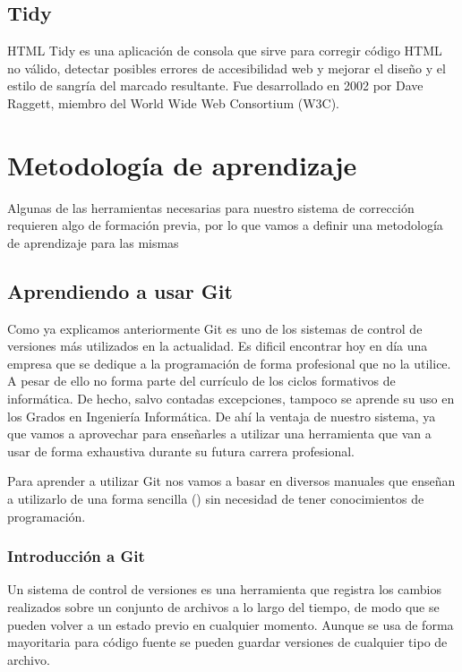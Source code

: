 \subsection {Tidy}

HTML Tidy es una aplicación de consola que sirve para corregir código HTML no válido, detectar posibles errores de accesibilidad web y mejorar el diseño y el estilo de sangría del marcado resultante. Fue desarrollado en 2002 por Dave Raggett, miembro del World Wide Web Consortium (W3C).

\section{Metodología de aprendizaje}

Algunas de las herramientas necesarias para nuestro sistema de corrección requieren algo de formación previa, por lo que vamos a definir una metodología de aprendizaje para las mismas

\subsection{Aprendiendo a usar Git}

Como ya explicamos anteriormente Git es uno de los sistemas de control de versiones más utilizados en la actualidad. Es dificil encontrar hoy en día una empresa que se dedique a la programación de forma profesional que no la utilice. A pesar de ello no forma parte del currículo de los ciclos formativos de informática. De hecho, salvo contadas excepciones, tampoco se aprende su uso en los Grados en Ingeniería Informática. De ahí la ventaja de nuestro sistema, ya que vamos a aprovechar para enseñarles a utilizar una herramienta que van a usar de forma exhaustiva durante su futura carrera profesional.

\bigskip
Para aprender a utilizar Git nos vamos a basar en diversos manuales que enseñan a utilizarlo de una forma sencilla (\cite{popov_control_2012}) sin necesidad de tener conocimientos de programación.

\subsubsection{Introducción a Git}

Un sistema de control de versiones es una herramienta que registra los cambios realizados sobre un conjunto de archivos a lo largo del tiempo, de modo que se pueden volver a un estado previo en cualquier momento. Aunque se usa de forma mayoritaria para código fuente  se pueden guardar versiones de cualquier tipo de archivo.

